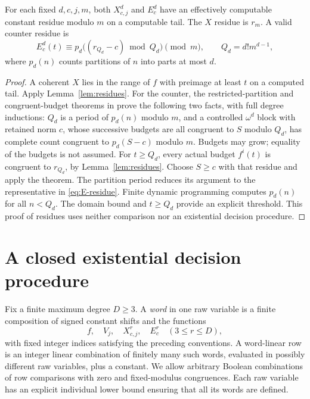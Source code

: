 \documentclass[11pt]{article}
\begin{document}
\begin{lemma}\label{lem:kernel-residues}
For each fixed $d,c,j,m$, both $X^d_{c,j}$ and $E^d_c$ have an effectively
computable constant residue modulo $m$ on a computable tail. The $X$
residue is $r_m$. A valid counter residue is
\begin{equation}\label{eq:E-residue}
 E^d_c(t)\equiv
 p_d\bigl((r_{Q_d}-c)\bmod Q_d\bigr)\pmod m,
 \qquad Q_d=d!m^{d-1},
\end{equation}
where $p_d(n)$ counts partitions of $n$ into parts at most $d$.
\end{lemma}
\begin{proof}
A coherent $X$ lies in the range of $f$ with preimage at least $t$ on a
computed tail. Apply Lemma~\ref{lem:residues}.
For the counter, the restricted-partition and congruent-budget theorems
in \cite{wwcounts} prove the following two facts, with full degree
inductions: $Q_d$ is a period of $p_d(n)$ modulo $m$, and a controlled
$\omega^d$ block with retained norm $c$, whose successive budgets are all
congruent to $S$ modulo $Q_d$, has complete count congruent to
$p_d(S-c)$ modulo $m$. Budgets may grow; equality of the budgets is not
assumed. For $t\ge Q_d$, every actual budget $f^{i}(t)$ is congruent to
$r_{Q_d}$, by Lemma~\ref{lem:residues}. Choose $S\ge c$ with that residue
and apply the theorem. The partition period reduces its argument to the
representative in \eqref{eq:E-residue}. Finite dynamic programming computes
$p_d(n)$ for all $n<Q_d$. The domain bound and $t\ge Q_d$ provide an
explicit threshold. This proof of residues uses neither comparison nor
an existential decision procedure.
\end{proof}

\section{A closed existential decision procedure}
Fix a finite maximum degree $D\ge3$. A \emph{word} in one raw variable
is a finite composition of signed constant shifts and the functions
\[
 f,\quad V_j,\quad X^r_{c,j},\quad E^r_c\quad(3\le r\le D),
\]
with fixed integer indices satisfying the preceding conventions. A
word-linear row is an integer linear combination of finitely many such
words, evaluated in possibly different raw variables, plus a constant.
We allow arbitrary Boolean combinations of row comparisons with zero and
fixed-modulus congruences. Each raw variable has an explicit individual
lower bound ensuring that all its words are defined.
\end{document}
